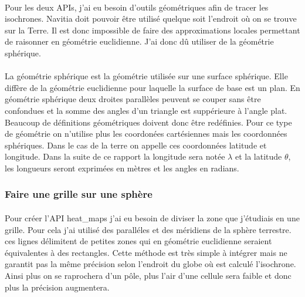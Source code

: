 \documentclass[a4paper]{report}
\begin{document}
\paragraph{} Pour les deux APIs, j'ai eu besoin d'outils géométriques afin de tracer les isochrones. Navitia doit pouvoir être utilisé quelque soit l'endroit où on se trouve sur la Terre. Il est donc impossible de faire des approximations locales permettant de raisonner en géométrie euclidienne. J'ai donc dû utiliser de la géométrie sphérique.

\paragraph{} La géométrie sphérique est la géométrie utilisée sur une surface sphérique. Elle diffère de la géométrie euclidienne pour laquelle la surface de base est un plan. En géométrie sphérique deux droites parallèles peuvent se couper sans être confondues et la somme des angles d'un triangle est suppérieure à l'angle plat. Beaucoup de définitions géométriques doivent donc être redéfinies. Pour ce type de géométrie on n'utilise plus les coordonées cartésiennes mais les coordonnées sphériques. Dans le cas de la terre on appelle ces coordonnées latitude et longitude. Dans la suite de ce rapport la longitude sera notée $\lambda$ et la latitude $\theta$, les longueurs seront exprimées en mètres et les angles en radians.

\subsubsection{Faire une grille sur une sphère}

\paragraph{} Pour créer l'API heat\_maps j'ai eu besoin de diviser la zone que j'étudiais en une grille. Pour cela j'ai utilisé des paralléles et des méridiens de la sphère terrestre. ces lignes délimitent de petites zones qui en géométrie euclidienne seraient équivalentes à des rectangles. Cette méthode est très simple à intégrer mais ne garantit pas la même précision selon l'endroit du globe où est calculé l'isochrone. Ainsi plus on se raprochera d'un pôle, plus l'air d'une cellule sera faible et donc plus la précision augmentera.
\end{document}
